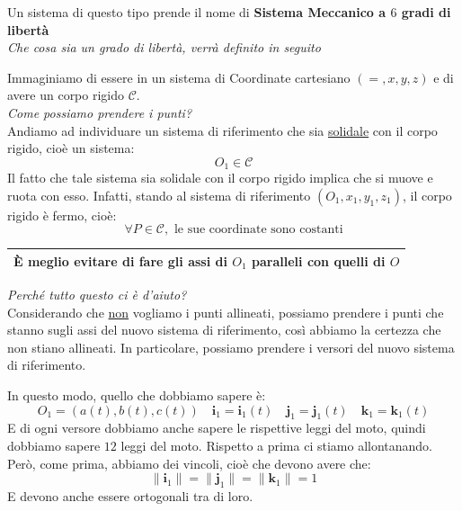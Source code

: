 \documentclass[11pt,a4paper,twoside]{article}
\theoremstyle{definition}
\begin{document}
Un sistema di questo tipo prende il nome di \textbf{Sistema Meccanico a $6$ gradi di libertà}\\
\textit{Che cosa sia un grado di libertà, verrà definito in seguito}

Immaginiamo di essere in un sistema di Coordinate cartesiano $(=, x, y, z)$ e di avere un corpo rigido $\mathscr C$.\\
\textit{Come possiamo prendere i punti?}\\
Andiamo ad individuare un sistema di riferimento che sia \underline{solidale} con il corpo rigido, cioè un sistema:
\[O_1 \in \mathscr C \]
Il fatto che tale sistema sia solidale con il corpo rigido implica che si muove e ruota con esso. Infatti, stando al sistema di riferimento $(O_1, x_1, y_1, z_1)$, il corpo rigido è fermo, cioè:
\[\forall P \in \mathscr C,\text{ le sue coordinate sono costanti}\]

\begin{center}
	\begin{tabular}{|c|}
		\hline
		\textbf{È meglio evitare di fare gli assi di $O_1$ paralleli con quelli di $O$}\\
		\hline
	\end{tabular}
\end{center}


\textit{Perché tutto questo ci è d'aiuto?}\\
Considerando che \underline{non} vogliamo i punti allineati, possiamo prendere i punti che stanno sugli assi del nuovo sistema di riferimento, così abbiamo la certezza che non stiano allineati. In particolare, possiamo prendere i versori del nuovo sistema di riferimento.

\begin{center}
\end{center}

In questo modo, quello che dobbiamo sapere è:
\[ O_1 = (a(t), b(t), c(t))\quad \mathbf i_1 = \mathbf i_1(t)\quad \mathbf j_1= \mathbf j_1(t) \quad \mathbf k_1 = \mathbf k_1(t) \]
E di ogni versore dobbiamo anche sapere le rispettive leggi del moto, quindi dobbiamo sapere $12$ leggi del moto. Rispetto a prima ci stiamo allontanando.\\
Però, come prima, abbiamo dei vincoli, cioè che devono avere che:
\[ \|\mathbf i_1\| = \|\mathbf j_1\| = \|\mathbf k_1\| = 1 \]
E devono anche essere ortogonali tra di loro.
\end{document}
